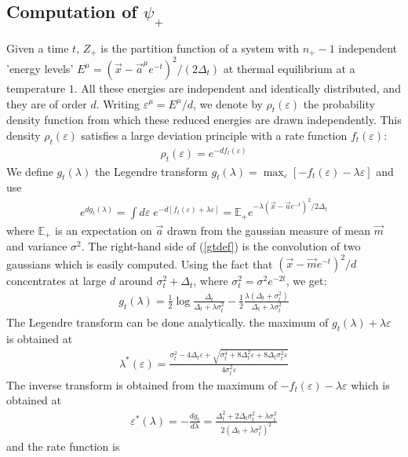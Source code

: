 \documentclass[10pt,twocolumn]{article}
\newcommand{\vx}{\vec x}
\newcommand{\va}{\vec a}
\newcommand{\vm}{\vec m}
\newcommand{\ve}{{\varepsilon}}
\newcommand{\expect}{{\mathbb{E}}}
\begin{document}
\subsection{Computation of $\psi_+$}
Given a time $t$, $Z_+$ is the partition function of a system with $n_+-1$ independent 'energy levels' $E^\mu =(\vx-\va^\mu e^{-t})^2/(2\Delta_t) $ at thermal equilibrium at a temperature $1$.  All these energies are independent and identically distributed, and they are of order $d$. Writing $\ve^\mu=E^\mu/d$, we denote by $\rho_t(\ve)$ the probability density function from which  these reduced energies are drawn independently. This density $\rho_t(\ve) $ satisfies a large deviation principle with a rate function $f_t(\ve)$:
\begin{align}
    \rho_t(\ve)=e^{-d f_t(\ve)}
\end{align}
We define 
 $g_t(\lambda)$ the Legendre transform $g_t(\lambda)=\max_{\ve} [-f_t(\ve)-\lambda \ve]$ and use 
\begin{align}
e^{d g_t(\lambda)}= \int d\ve \; e^{-d [f_t(\ve)+\lambda\ve] }=\expect_+ e^{-\lambda (\vx- \va e^{-t})^2/2\Delta_t}
\label{gtdef}
\end{align}
where $\expect_+ $ is an expectation on $\vec a$ drawn from the gaussian measure of mean $\vm$ and variance $\sigma^2$. 
The right-hand side of (\ref{gtdef}) is the convolution of two gaussians which is easily computed. Using the fact that $(\vx-\vm e^{-t})^2/d$ concentrates at large $d$ around $\sigma_t^2+\Delta_t$, where $\sigma_t^2=\sigma^2 e^{-2 t}$, we get:
\begin{align}
g_t(\lambda)=\frac{1}{2}\log \frac{\Delta_t}{\Delta_t+\lambda \sigma_t^2}- \frac{1}{2}\frac{\lambda (\Delta_t+\sigma_t^2)}{\Delta_t+\lambda \sigma_t^2}
\end{align}
The Legendre transform can be done analytically. the maximum of $g_t(\lambda)+\lambda
 \ve$ is obtained at 
\begin{align}
    \lambda^*(\ve)= \frac{\sigma_t^2-4\Delta_t\ve +\sqrt{\sigma_t^4+8\Delta_t^2 \ve +8\Delta_t\sigma_t^2 \ve}}{4\sigma_t^2 \ve}
\end{align}
The inverse transform is obtained from the maximum of $-f_t(\ve)-\lambda \ve$ which is obtained at 
\begin{align}
\ve^*(\lambda)= -\frac{d g_t}{d\lambda }= \frac{\Delta_t^2+2\Delta_t\sigma_t^2+\lambda \sigma_t^2}{2(\Delta_t+\lambda \sigma_t^2)^2}
\end{align}
and the rate function is
\end{document}
